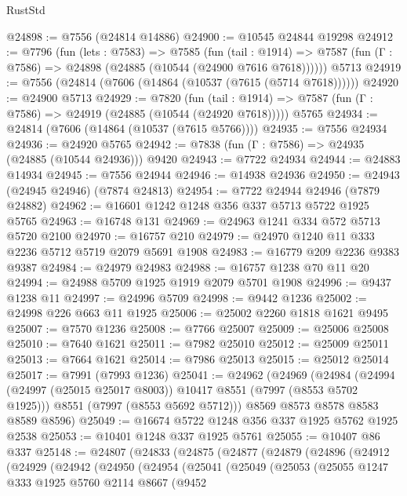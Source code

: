 \begin{lexlean}{RustStd}
\begin{coremodule}
@24898 := @7556 (@24814 @14886)
@24900 := @10545 @24844 @19298
@24912 := @7796
    (fun (lets : @7583) =>
    @7585
      (fun (tail : @1914) =>
      @7587 (fun (Γ : @7586) => @24898 (@24885 (@10544 (@24900 @7616 @7618))))))
    @5713
@24919 := @7556 (@24814 (@7606 (@14864 (@10537 (@7615 (@5714 @7618))))))
@24920 := @24900 @5713
@24929 := @7820
    (fun (tail : @1914) => @7587 (fun (Γ : @7586) => @24919 (@24885 (@10544 (@24920 @7618)))))
    @5765
@24934 := @24814 (@7606 (@14864 (@10537 (@7615 @5766))))
@24935 := @7556 @24934
@24936 := @24920 @5765
@24942 := @7838 (fun (Γ : @7586) => @24935 (@24885 (@10544 @24936))) @9420
@24943 := @7722 @24934
@24944 := @24883 @14934
@24945 := @7556 @24944
@24946 := @14938 @24936
@24950 := @24943 (@24945 @24946) (@7874 @24813)
@24954 := @7722 @24944 @24946 (@7879 @24882)
@24962 := @16601 @1242 @1248 @356 @337 @5713 @5722 @1925 @5765
@24963 := @16748 @131
@24969 := @24963 @1241 @334 @572 @5713 @5720 @2100
@24970 := @16757 @210
@24979 := @24970 @1240 @11 @333 @2236 @5712 @5719 @2079 @5691 @1908
@24983 := @16779 @209 @2236 @9383 @9387
@24984 := @24979 @24983
@24988 := @16757 @1238 @70 @11 @20
@24994 := @24988 @5709 @1925 @1919 @2079 @5701 @1908
@24996 := @9437 @1238 @11
@24997 := @24996 @5709
@24998 := @9442 @1236
@25002 := @24998 @226 @663 @11 @1925
@25006 := @25002 @2260 @1818 @1621 @9495
@25007 := @7570 @1236
@25008 := @7766 @25007
@25009 := @25006 @25008
@25010 := @7640 @1621
@25011 := @7982 @25010
@25012 := @25009 @25011
@25013 := @7664 @1621
@25014 := @7986 @25013
@25015 := @25012 @25014
@25017 := @7991 (@7993 @1236)
@25041 := @24962
    (@24969
      (@24984
        (@24994 (@24997 (@25015 @25017 @8003)) @10417 @8551 (@7997 (@8553 @5702 @1925)))
        @8551
        (@7997 (@8553 @5692 @5712)))
      @8569
      @8573
      @8578
      @8583
      @8589
      @8596)
@25049 := @16674 @5722 @1248 @356 @337 @1925 @5762 @1925 @2538
@25053 := @10401 @1248 @337 @1925 @5761
@25055 := @10407 @86 @337
@25148 := @24807
    (@24833
      (@24875
        (@24877
          (@24879
            (@24896
              (@24912
                (@24929
                  (@24942
                    (@24950
                      (@24954
                        (@25041
                          (@25049
                            (@25053
                              (@25055
                                @1247
                                @333
                                @1925
                                @5760
                                @2114
                                @8667
                                (@9452

\end{coremodule}
\end{lexlean}
